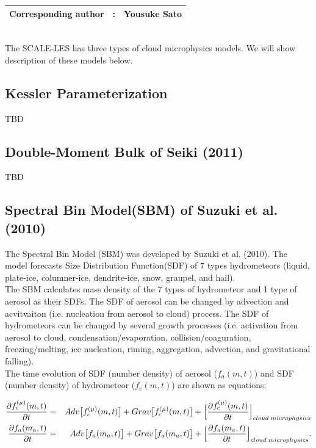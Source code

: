 {\bf \Large 
\begin{tabular}{ccc}
\hline
  Corresponding author & : & Yousuke Sato\\
\hline
\end{tabular}
}
\\
 The SCALE-LES has three types of cloud microphysics models. We will show description of these models below.

\subsection{Kessler Parameterization}
{\Huge TBD}

\subsection{Double-Moment Bulk of Seiki (2011)}
{\Huge TBD}

\subsection{Spectral Bin Model(SBM) of Suzuki et al. (2010)}
The Spectral Bin Model (SBM) was developed by Suzuki et al. (2010). The model forecasts Size Distribution Function(SDF) of 7 types hydrometeors (liquid, plate-ice, columner-ice, dendrite-ice, snow, graupel, and hail). \\
The SBM calculates mass density of the 7 types of hydrometeor and 1 type of aerosol as their SDFs. The SDF of aerosol can be changed by advection and acvitvaiton (i.e. nucleation from aerosol to cloud) process. The SDF of hydrometeors can be changed by several growth processes (i.e. activation from aerosol to cloud, condensation/evaporation, collision/coaguration, freezing/melting, ice nucleation, riming, aggregation, advection, and gravitational falling). \\
The time evolution of SDF (number density) of aerosol ($f_{a}(m,t)$) and SDF (number density) of hydrometeor ($f_{c}(m,t)$) are shown as equations:

\begin{eqnarray}
\frac{\partial f^{(\mu)}_{c}(m,t)}{\partial t}&=&Adv\bigl[f^{(\mu)}_{c}(m,t)\bigr]+Grav\bigl[f^{(\mu)}_{c}(m,t)\bigr]+\Bigl[ \frac{\partial f^{(\mu)}_{c}(m,t)}{\partial t}\Bigr ]_{cloud\;microphysics}\\
\frac{\partial f_{a}(m_{a},t)}{\partial t}&=&Adv\bigl[f_{a}(m_{a},t)\bigr]+Grav\bigl[f_{a}(m_{a},t)\bigr]+\Bigl[ \frac{\partial f_{a}(m_{a},t)}{\partial t} \Bigr ]_{cloud\;microphysics}.
\end{eqnarray} 

